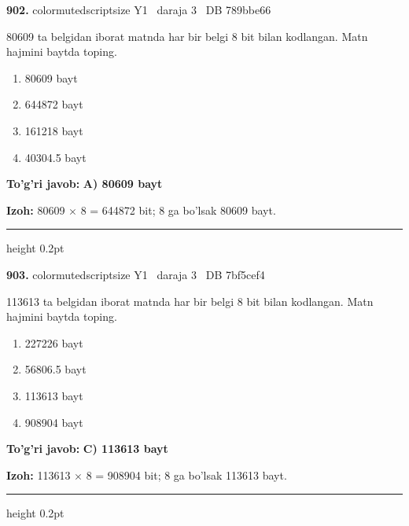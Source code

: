 \documentclass[10pt,a4paper,oneside]{article}
\begin{document}
\noindent\textbf{\color{ink}902.}  {color{muted}scriptsize Y1 \textbullet\ daraja 3 \textbullet\ DB 789bbe66}
\par
80609 ta belgidan iborat matnda har bir belgi 8 bit bilan kodlangan. Matn hajmini baytda toping.
\begin{enumerate}[label=\Alph*),leftmargin=9mm]
\item 80609 bayt
\item 644872 bayt
\item 161218 bayt
\item 40304.5 bayt
\end{enumerate}
\begin{tcolorbox}[enhanced,breakable,colback=teal!4,colframe=teal!50!black,boxrule=0.5pt,arc=1.1mm,left=3mm,right=3mm,top=1.7mm,bottom=1.7mm,before skip=2mm,after skip=2mm]
\textbf{\color{teal}To'g'ri javob:} \textbf{A) 80609 bayt}
\par\smallskip
\textbf{Izoh:} 80609 \ensuremath{\times} 8 = 644872 bit; 8 ga bo'lsak 80609 bayt.
\end{tcolorbox}
\vspace{2mm}\hrule height 0.2pt \vspace{3mm}

\noindent\textbf{\color{ink}903.}  {color{muted}scriptsize Y1 \textbullet\ daraja 3 \textbullet\ DB 7bf5cef4}
\par
113613 ta belgidan iborat matnda har bir belgi 8 bit bilan kodlangan. Matn hajmini baytda toping.
\begin{enumerate}[label=\Alph*),leftmargin=9mm]
\item 227226 bayt
\item 56806.5 bayt
\item 113613 bayt
\item 908904 bayt
\end{enumerate}
\begin{tcolorbox}[enhanced,breakable,colback=teal!4,colframe=teal!50!black,boxrule=0.5pt,arc=1.1mm,left=3mm,right=3mm,top=1.7mm,bottom=1.7mm,before skip=2mm,after skip=2mm]
\textbf{\color{teal}To'g'ri javob:} \textbf{C) 113613 bayt}
\par\smallskip
\textbf{Izoh:} 113613 \ensuremath{\times} 8 = 908904 bit; 8 ga bo'lsak 113613 bayt.
\end{tcolorbox}
\vspace{2mm}\hrule height 0.2pt \vspace{3mm}
\end{document}
